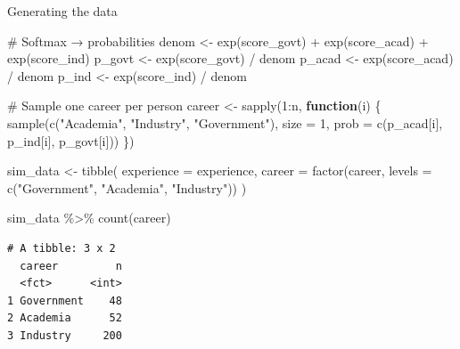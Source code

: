 \documentclass[
  ignorenonframetext,
]{beamer}
\newenvironment{Shaded}{\begin{snugshade}}{\end{snugshade}}
\newcommand{\AttributeTok}[1]{\textcolor[rgb]{0.40,0.45,0.13}{#1}}
\newcommand{\CommentTok}[1]{\textcolor[rgb]{0.37,0.37,0.37}{#1}}
\newcommand{\ControlFlowTok}[1]{\textcolor[rgb]{0.00,0.23,0.31}{\textbf{#1}}}
\newcommand{\DecValTok}[1]{\textcolor[rgb]{0.68,0.00,0.00}{#1}}
\newcommand{\FunctionTok}[1]{\textcolor[rgb]{0.28,0.35,0.67}{#1}}
\newcommand{\NormalTok}[1]{\textcolor[rgb]{0.00,0.23,0.31}{#1}}
\newcommand{\OtherTok}[1]{\textcolor[rgb]{0.00,0.23,0.31}{#1}}
\newcommand{\SpecialCharTok}[1]{\textcolor[rgb]{0.37,0.37,0.37}{#1}}
\newcommand{\StringTok}[1]{\textcolor[rgb]{0.13,0.47,0.30}{#1}}
\begin{document}
\begin{frame}[fragile]{Generating the data}
\label{generating-the-data}
\begin{Shaded}
\begin{Highlighting}[]
\CommentTok{\# Softmax → probabilities}
\NormalTok{denom  }\OtherTok{\textless{}{-}} \FunctionTok{exp}\NormalTok{(score\_govt) }\SpecialCharTok{+} \FunctionTok{exp}\NormalTok{(score\_acad) }\SpecialCharTok{+} \FunctionTok{exp}\NormalTok{(score\_ind)}
\NormalTok{p\_govt }\OtherTok{\textless{}{-}} \FunctionTok{exp}\NormalTok{(score\_govt) }\SpecialCharTok{/}\NormalTok{ denom}
\NormalTok{p\_acad }\OtherTok{\textless{}{-}} \FunctionTok{exp}\NormalTok{(score\_acad) }\SpecialCharTok{/}\NormalTok{ denom}
\NormalTok{p\_ind  }\OtherTok{\textless{}{-}} \FunctionTok{exp}\NormalTok{(score\_ind)  }\SpecialCharTok{/}\NormalTok{ denom}

\CommentTok{\# Sample one career per person}
\NormalTok{career }\OtherTok{\textless{}{-}} \FunctionTok{sapply}\NormalTok{(}\DecValTok{1}\SpecialCharTok{:}\NormalTok{n, }\ControlFlowTok{function}\NormalTok{(i) \{}
  \FunctionTok{sample}\NormalTok{(}\FunctionTok{c}\NormalTok{(}\StringTok{"Academia"}\NormalTok{, }\StringTok{"Industry"}\NormalTok{, }\StringTok{"Government"}\NormalTok{),}
         \AttributeTok{size =} \DecValTok{1}\NormalTok{,}
         \AttributeTok{prob =} \FunctionTok{c}\NormalTok{(p\_acad[i], p\_ind[i], p\_govt[i]))}
\NormalTok{\})}

\NormalTok{sim\_data }\OtherTok{\textless{}{-}} \FunctionTok{tibble}\NormalTok{(}
  \AttributeTok{experience =}\NormalTok{ experience,}
  \AttributeTok{career     =} \FunctionTok{factor}\NormalTok{(career, }\AttributeTok{levels =} \FunctionTok{c}\NormalTok{(}\StringTok{"Government"}\NormalTok{, }\StringTok{"Academia"}\NormalTok{, }\StringTok{"Industry"}\NormalTok{))}
\NormalTok{)}

\NormalTok{sim\_data }\SpecialCharTok{\%\textgreater{}\%} \FunctionTok{count}\NormalTok{(career)}
\end{Highlighting}
\end{Shaded}

\begin{verbatim}
# A tibble: 3 x 2
  career         n
  <fct>      <int>
1 Government    48
2 Academia      52
3 Industry     200
\end{verbatim}

\end{frame}
\end{document}
